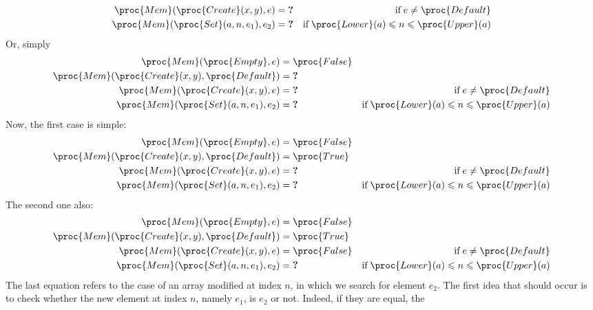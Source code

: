 \begin{itemize}
\begin{align*}
        \proc{Mem} (\proc{Create} (x, y), e)
     &= \textbf{?}
     & \text{if} \; e \neq \proc{Default}\\
        \proc{Mem} (\proc{Set} (a, n, e_1), e_2)
     &= \textbf{?}
     & \text{if} \; \proc{Lower} (a) \leqslant n \leqslant
     \proc{Upper} (a)
    \end{align*}
    Or, simply
    \begin{align*}
        \proc{Mem} (\proc{Empty}, e)
     &= \proc{False}\\
        \proc{Mem} (\proc{Create} (x, y), \proc{Default})
     &= \textbf{?}\\
        \proc{Mem} (\proc{Create} (x, y), e)
     &= \textbf{?}
     & \text{if} \; e \neq \proc{Default}\\
        \proc{Mem} (\proc{Set} (a, n, e_1), e_2)
     &= \textbf{?}
     & \text{if} \; \proc{Lower} (a) \leqslant n \leqslant
     \proc{Upper} (a)
    \end{align*}
    Now, the first case is simple:
    \begin{align*}
        \proc{Mem} (\proc{Empty}, e)
     &= \proc{False}\\
        \proc{Mem} (\proc{Create} (x, y), \proc{Default})
     &= \proc{True}\\
        \proc{Mem} (\proc{Create} (x, y), e)
     &= \textbf{?}
     & \text{if} \; e \neq \proc{Default}\\
        \proc{Mem} (\proc{Set} (a, n, e_1), e_2)
     &= \textbf{?}
     & \text{if} \; \proc{Lower} (a) \leqslant n \leqslant
     \proc{Upper} (a)
    \end{align*}
    The second one also:
    \begin{align*}
        \proc{Mem} (\proc{Empty}, e)
     &= \proc{False}\\
        \proc{Mem} (\proc{Create} (x, y), \proc{Default})
     &= \proc{True}\\
        \proc{Mem} (\proc{Create} (x, y), e)
     &= \proc{False}
     & \text{if} \; e \neq \proc{Default}\\
        \proc{Mem} (\proc{Set} (a, n, e_1), e_2)
     &= \textbf{?}
     & \text{if} \; \proc{Lower} (a) \leqslant n \leqslant
     \proc{Upper} (a)
    \end{align*}
    The last equation refers to the case of an array modified at index
    \(n\), in which we search for element \(e_2\). The first idea that
    should occur is to check whether the new element at index \(n\),
    namely \(e_1\), is \(e_2\) or not. Indeed, if they are equal, the

\end{itemize}

